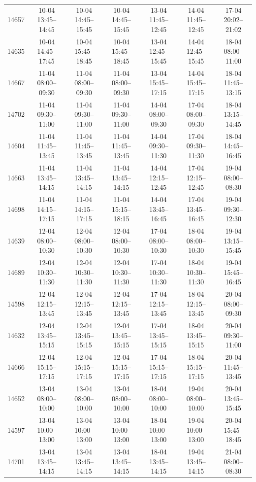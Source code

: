 \begin{table}[htbp]
\begin{tabular}{|r|c|c|c|c|c|c|}
14657 & 10-04 13:45--14:45 & 10-04 14:45--15:45 & 10-04 14:45--15:45 & 13-04 11:45--12:45 & 14-04 11:45--12:45 & 17-04 20:02--21:02 \\ 
14635 & 10-04 14:45--17:45 & 10-04 15:45--18:45 & 10-04 15:45--18:45 & 13-04 12:45--15:45 & 14-04 12:45--15:45 & 18-04 08:00--11:00 \\ 
14667 & 11-04 08:00--09:30 & 11-04 08:00--09:30 & 11-04 08:00--09:30 & 13-04 15:45--17:15 & 14-04 15:45--17:15 & 18-04 11:45--13:15 \\ 
14702 & 11-04 09:30--11:00 & 11-04 09:30--11:00 & 11-04 09:30--11:00 & 14-04 08:00--09:30 & 17-04 08:00--09:30 & 18-04 13:15--14:45 \\ 
14604 & 11-04 11:45--13:45 & 11-04 11:45--13:45 & 11-04 11:45--13:45 & 14-04 09:30--11:30 & 17-04 09:30--11:30 & 18-04 14:45--16:45 \\ 
14663 & 11-04 13:45--14:15 & 11-04 13:45--14:15 & 11-04 13:45--14:15 & 14-04 12:15--12:45 & 17-04 12:15--12:45 & 19-04 08:00--08:30 \\ 
14698 & 11-04 14:15--17:15 & 11-04 14:15--17:15 & 11-04 15:15--18:15 & 14-04 13:45--16:45 & 17-04 13:45--16:45 & 19-04 09:30--12:30 \\ 
14639 & 12-04 08:00--10:30 & 12-04 08:00--10:30 & 12-04 08:00--10:30 & 17-04 08:00--10:30 & 18-04 08:00--10:30 & 19-04 13:15--15:45 \\ 
14689 & 12-04 10:30--11:30 & 12-04 10:30--11:30 & 12-04 10:30--11:30 & 17-04 10:30--11:30 & 18-04 10:30--11:30 & 19-04 15:45--16:45 \\ 
14598 & 12-04 12:15--13:45 & 12-04 12:15--13:45 & 12-04 12:15--13:45 & 17-04 12:15--13:45 & 18-04 12:15--13:45 & 20-04 08:00--09:30 \\ 
14632 & 12-04 13:45--15:15 & 12-04 13:45--15:15 & 12-04 13:45--15:15 & 17-04 13:45--15:15 & 18-04 13:45--15:15 & 20-04 09:30--11:00 \\ 
14666 & 12-04 15:15--17:15 & 12-04 15:15--17:15 & 12-04 15:15--17:15 & 17-04 15:15--17:15 & 18-04 15:15--17:15 & 20-04 11:45--13:45 \\ 
14652 & 13-04 08:00--10:00 & 13-04 08:00--10:00 & 13-04 08:00--10:00 & 18-04 08:00--10:00 & 19-04 08:00--10:00 & 20-04 13:45--15:45 \\ 
14597 & 13-04 10:00--13:00 & 13-04 10:00--13:00 & 13-04 10:00--13:00 & 18-04 10:00--13:00 & 19-04 10:00--13:00 & 20-04 15:45--18:45 \\ 
14701 & 13-04 13:45--14:15 & 13-04 13:45--14:15 & 13-04 13:45--14:15 & 18-04 13:45--14:15 & 19-04 13:45--14:15 & 21-04 08:00--08:30 \\ 

\end{tabular}
\end{table}
